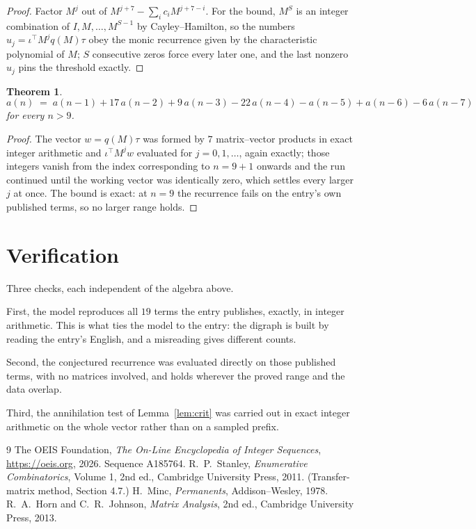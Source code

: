 \documentclass[11pt,a4paper]{article}
\theoremstyle{plain}
\newtheorem{theorem}{Theorem}
\theoremstyle{definition}
\begin{document}
\begin{proof}
Factor $M^{j}$ out of $M^{j+7}-\sum_ic_iM^{j+7-i}$. For the bound, $M^{S}$
is an integer combination of $I,M,\dots,M^{S-1}$ by Cayley--Hamilton, so the numbers
$u_j=\iota^{\!\top}M^{j}q(M)\tau$ obey the monic recurrence given by the characteristic
polynomial of $M$; $S$ consecutive zeros force every later one, and the last nonzero $u_j$
pins the threshold exactly.
\end{proof}

\begin{theorem}
\[
a(n)\;=\;a(n-1) + 17\,a(n-2) + 9\,a(n-3) - 22\,a(n-4) - a(n-5) + a(n-6) - 6\,a(n-7)
\]
for every $n>9$.
\end{theorem}

\begin{proof}
The vector $w=q(M)\tau$ was formed by $7$ matrix--vector products in exact integer
arithmetic and $\iota^{\!\top}M^{j}w$ evaluated for $j=0,1,\dots$, again exactly; those
integers vanish from the index corresponding to $n=9+1$ onwards and the run continued
until the working vector was identically zero, which settles every larger $j$ at once. The bound is exact: at $n=9$ the recurrence fails on the entry's own published terms, so no larger range holds.
\end{proof}

\section{Verification}

Three checks, each independent of the algebra above.

First, the model reproduces all $19$ terms the entry publishes, exactly, in integer
arithmetic. This is what ties the model to the entry: the digraph is built by reading the
entry's English, and a misreading gives different counts.

Second, the conjectured recurrence was evaluated directly on those published terms, with no
matrices involved, and holds wherever the proved range and the data overlap.

Third, the annihilation test of Lemma~\ref{lem:crit} was carried out in exact integer
arithmetic on the whole vector rather than on a sampled prefix.

\begin{thebibliography}{9}
 The OEIS Foundation, \emph{The On-Line Encyclopedia of Integer
Sequences}, \url{https://oeis.org}, 2026. Sequence A185764.
 R.~P.~Stanley, \emph{Enumerative Combinatorics}, Volume 1, 2nd ed.,
Cambridge University Press, 2011. (Transfer-matrix method, Section 4.7.)
 H.~Minc, \emph{Permanents}, Addison--Wesley, 1978.
 R.~A.~Horn and C.~R.~Johnson, \emph{Matrix Analysis}, 2nd ed., Cambridge
University Press, 2013.
\end{thebibliography}
\end{document}

